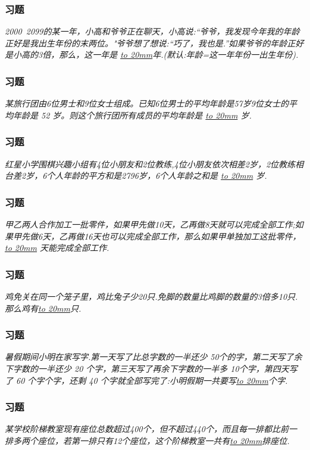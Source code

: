 \begin{frame}
    \frametitle{习题\theframecounter}
    \textit{2000~2099的某一年，小高和爷爷正在聊天，小高说:“爷爷，我发现今年我的年龄正好是我出生年份的末两位。"爷爷想了想说:“巧了，我也是.”如果爷爷的年龄正好是小高的3倍，那么，这一年是 \underline{\hbox to 20mm{}}年.(默认:年龄=这一年年份一出生年份).} 
\end{frame}


\begin{frame}
    \frametitle{习题\theframecounter}
    \textit{某旅行团由6位男士和9位女士组成。已知6位男士的平均年龄是57岁9位女士的平均年龄是 52 岁。则这个旅行团所有成员的平均年龄是 \underline{\hbox to 20mm{}} 岁.} 
\end{frame}

\begin{frame}
    \frametitle{习题\theframecounter}
    \textit{红星小学围棋兴趣小组有4位小朋友和2位教练,4位小朋友依次相差2岁，2位教练相台差2岁，6个人年龄的平方和是2796岁，6个人年龄之和是 \underline{\hbox to 20mm{}} 岁.} 
\end{frame}

\begin{frame}
    \frametitle{习题\theframecounter}
    \textit{甲乙两人合作加工一批零件，如果甲先做10天，乙再做8天就可以完成全部工作;如果甲先做6天，乙再做16天也可以完成全部工作，那么如果甲单独加工这批零件，\underline{\hbox to 20mm{}}
    天能完成全部工作.} 
\end{frame}


\begin{frame}
    \frametitle{习题\theframecounter}
    \textit{鸡免关在同一个笼子里，鸡比兔子少20只.免脚的数量比鸡脚的数量的3倍多10只.那么鸡有\underline{\hbox to 20mm{}}只.} 
\end{frame}

\begin{frame}
    \frametitle{习题\theframecounter}
    \textit{暑假期间小明在家写字.第一天写了比总字数的一半还少 50个的字，第二天写了余下字数的一半还少 20 个字，第三天写了再余下字数的一半多 10个字，第四天写了 60 个字个字，还剩 40 个字就全部写完了:小明假期一共要写\underline{\hbox to 20mm{}}个字.} 
\end{frame}


\begin{frame}
    \frametitle{习题\theframecounter}
    \textit{某学校阶梯教室现有座位总数超过400个，但不超过440个，而且每一排都比前一排多两个座位，若第一排只有12个座位，这个阶梯教室一共有\underline{\hbox to 20mm{}}排座位.} 
\end{frame}


